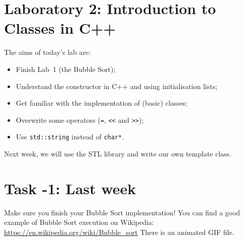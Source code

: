 
\section*{Laboratory 2: Introduction to Classes in C++}

%
%
%
%    
%    

The aims of today's lab are:
\begin{itemize}
\item Finish Lab~1 (the Bubble Sort);
\item Understand the constructor in C++ and using initialisation lists;
\item Get familiar with the implementation of (basic) classes;
\item Overwrite some operators (\verb+=+, \verb+<<+ and \verb+>>+);
\item Use \verb+std::string+ instead of \verb+char*+.
\end{itemize}

Next week, we will use the STL library and write our own template class.

\section{Task -1: Last week}

Make sure you finish your Bubble Sort implementation!
You can find a good example of Bubble Sort execution on Wikipedia:
\url{https://en.wikipedia.org/wiki/Bubble_sort}
There is an animated GIF file.

